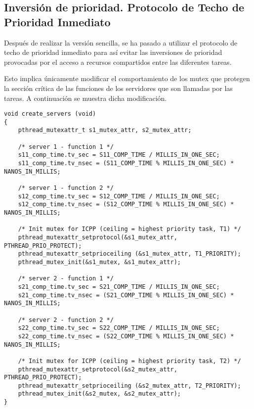 \documentclass[11pt,spanish]{article}
\begin{document}
\subsection{Inversión de prioridad. Protocolo de Techo de Prioridad Inmediato}
Después de realizar la versión sencilla, se ha pasado a utilizar el protocolo
de techo de prioridad inmediato para así evitar las inversiones de prioridad provocadas
por el acceso a recursos compartidos entre las diferentes tareas.

Esto implica únicamente modificar el comportamiento de los mutex que protegen 
la sección crítica de las funciones de los servidores que son llamadas por las tareas.
A continuación se muestra dicha modificación.

\begin{lstlisting}[style=c]
void create_servers (void) 
{	
	pthread_mutexattr_t s1_mutex_attr, s2_mutex_attr;

    /* server 1 - function 1 */
    s11_comp_time.tv_sec = S11_COMP_TIME / MILLIS_IN_ONE_SEC;
    s11_comp_time.tv_nsec = (S11_COMP_TIME % MILLIS_IN_ONE_SEC) * NANOS_IN_MILLIS;

    /* server 1 - function 2 */
    s12_comp_time.tv_sec = S12_COMP_TIME / MILLIS_IN_ONE_SEC;
    s12_comp_time.tv_nsec = (S12_COMP_TIME % MILLIS_IN_ONE_SEC) * NANOS_IN_MILLIS;

    /* Init mutex for ICPP (ceiling = highest priority task, T1) */
    pthread_mutexattr_setprotocol(&s1_mutex_attr, PTHREAD_PRIO_PROTECT);
    pthread_mutexattr_setprioceiling (&s1_mutex_attr, T1_PRIORITY);
    pthread_mutex_init(&s1_mutex, &s1_mutex_attr); 

    /* server 2 - function 1 */
    s21_comp_time.tv_sec = S21_COMP_TIME / MILLIS_IN_ONE_SEC;
    s21_comp_time.tv_nsec = (S21_COMP_TIME % MILLIS_IN_ONE_SEC) * NANOS_IN_MILLIS;

    /* server 2 - function 2 */
    s22_comp_time.tv_sec = S22_COMP_TIME / MILLIS_IN_ONE_SEC;
    s22_comp_time.tv_nsec = (S22_COMP_TIME % MILLIS_IN_ONE_SEC) * NANOS_IN_MILLIS;

    /* Init mutex for ICPP (ceiling = highest priority task, T2) */
    pthread_mutexattr_setprotocol(&s2_mutex_attr, PTHREAD_PRIO_PROTECT);
    pthread_mutexattr_setprioceiling (&s2_mutex_attr, T2_PRIORITY);
    pthread_mutex_init(&s2_mutex, &s2_mutex_attr); 
}
\end{lstlisting}

\end{document}
